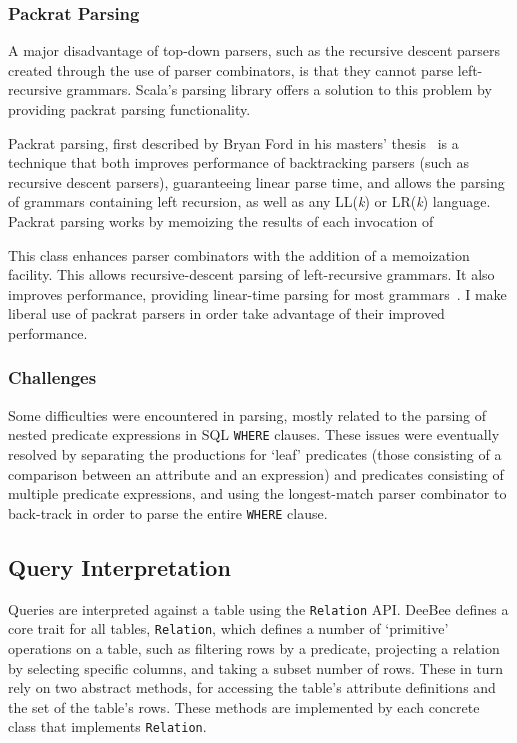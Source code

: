 \subsubsection{Packrat Parsing}
A major disadvantage of top-down parsers, such as the recursive descent parsers created through the use of parser combinators, is that they cannot parse left-recursive grammars. Scala's parsing library offers a solution to this problem by providing packrat parsing functionality.

Packrat parsing, first described by Bryan Ford in his masters' thesis~\cite{ford2002packrat} is a technique that both improves performance of backtracking parsers (such as recursive descent parsers), guaranteeing linear parse time, and allows the parsing of grammars containing left recursion, as well as any LL(\textit{k}) or LR(\textit{k}) language. Packrat parsing works by memoizing the results of each invocation of 

This class enhances parser combinators with the addition of a memoization facility. This allows recursive-descent parsing of left-recursive grammars. It also improves performance, providing linear-time parsing for most grammars~\cite{jonnalagedda2009packrat,ford2002packrat,ford2002packrat2}. I make liberal use of packrat parsers in order take advantage of their improved performance.

\subsubsection{Challenges}
Some difficulties were encountered in parsing, mostly related to the parsing of nested predicate expressions in SQL \texttt{WHERE} clauses. These issues were eventually resolved by separating the productions for `leaf' predicates (those consisting of a comparison between an attribute and an expression) and predicates consisting of multiple predicate expressions, and using the longest-match parser combinator to back-track in order to parse the entire \texttt{WHERE} clause.

\subsection{Query Interpretation}
\label{sec:query}
Queries are interpreted against a table using the \texttt{Relation} API. DeeBee defines a core trait for all tables, \texttt{Relation}, which defines a number of `primitive' operations on a table, such as filtering rows by a predicate, projecting a relation by selecting specific columns, and taking a subset number of rows. These in turn rely on two abstract methods, for accessing the table's attribute definitions and the set of the table's rows. These methods are implemented by each concrete class that implements \texttt{Relation}.

